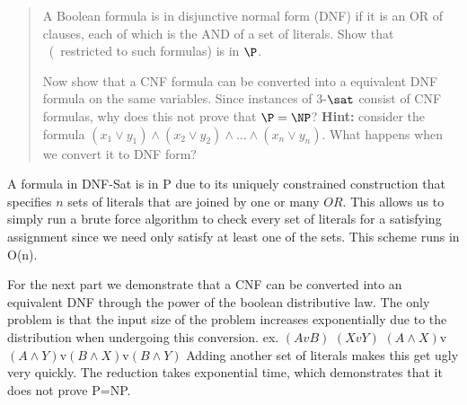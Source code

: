 
\begin{exercise}[subtitle = {CNF vs.\ DNF }]
    \begin{quote}
    A Boolean formula is in disjunctive normal form (DNF) if it is an OR of clauses,
    each of which is the AND of a set of literals.
    Show that \dnfsat\ (\sat\ restricted to such formulas) is in $\P$.

    Now show that a CNF formula can be converted into a equivalent DNF formula on the same variables.
    Since instances of 3-$\sat$ consist of CNF formulas, why does this not prove that $\P = \NP$?
    {\bf Hint:} consider the formula $(x_1 \vee  y_1) \wedge (x_2 \vee y_2) \wedge \ldots \wedge (x_n \vee y_n).$
    What happens when we convert it to DNF form?
    \end{quote}
\end{exercise}


\begin{solution}
A formula in DNF-Sat is in P due to its uniquely constrained construction that specifies $n$ sets of literals that are joined by one or many $OR$. This allows us to simply run a brute force algorithm to check every set of literals for a satisfying assignment since we need only satisfy at least one of the sets. This scheme runs in O(n).

For the next part we demonstrate that a CNF can be converted into an equivalent DNF through the power of the boolean distributive law. The only problem is that the input size of the problem increases exponentially due to the distribution when undergoing this conversion. ex. $(AvB)$ \wedge $(XvY)$ \equiv $(A\wedge X)$v$(A \wedge Y)$v$(B \wedge X)$v$(B \wedge Y)$ Adding another set of literals makes this get ugly very quickly. The reduction takes exponential time, which demonstrates that it does not prove P=NP.

\end{solution}
